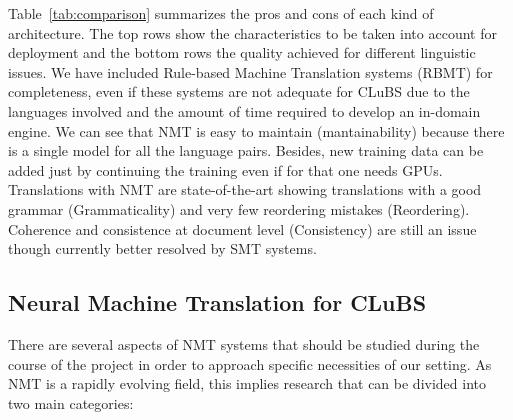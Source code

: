 \documentclass[a4paper,11pt]{article}
\begin{document}
Table~\ref{tab:comparison} summarizes the pros and cons of each kind of architecture. The top rows show  the characteristics to be taken into account for deployment and the bottom rows the quality achieved for different linguistic issues. 
We have included Rule-based Machine Translation systems (RBMT) for completeness, even if these systems are not adequate for CLuBS due to the languages involved and the amount of time required to develop an in-domain engine.
We can see that NMT is easy to maintain (mantainability) because there is a single model for all the language pairs. Besides, new training data can be added just by continuing the training even if for that one needs GPUs.   
Translations with NMT are state-of-the-art showing translations with a good grammar (Grammaticality) and very few reordering mistakes (Reordering). Coherence and consistence at document level (Consistency) are still an issue though currently better resolved by SMT systems. 

% 



\subsection{Neural Machine Translation for CLuBS}
\label{ss:system}

There are several aspects of NMT systems that should be studied during the course of the project in order to approach specific necessities of our setting. As NMT is a rapidly evolving field, this implies research that can be divided into two main categories: 
\end{document}
